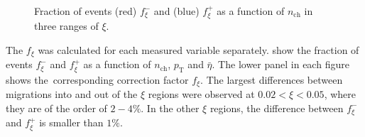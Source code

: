 \begin{figure}[h!]
\begin{subfigure}{.49\textwidth}
 	\end{subfigure}
 	\begin{minipage}{.49\textwidth}
 		\caption{Fraction of events (red) $f_{\xi}^-$ and (blue)  $f_{\xi}^+$ as a function of $n_\textrm{ch}$ in three ranges of $\xi$.}
 		\label{fig:xi_correction_nch}
 	\end{minipage}
 	
 \end{figure}
 
 The $f_{\xi}$ was calculated for each measured variable separately.  show the fraction of events $f_{\xi}^-$ and $f_{\xi}^+$ as a function of $n_\textrm{ch}$, $p_\textrm{T}$ and $\bar{\eta}$. The lower panel in each figure shows the~corresponding correction factor $f_\xi$. The largest differences between migrations into and out of the $\xi$ regions were observed at $0.02<\xi<0.05$, where they are of the order of $2-4\%$. In the other $\xi$ regions, the difference between $f_{\xi}^-$ and $f_{\xi}^+$  is smaller than $1\%$.
